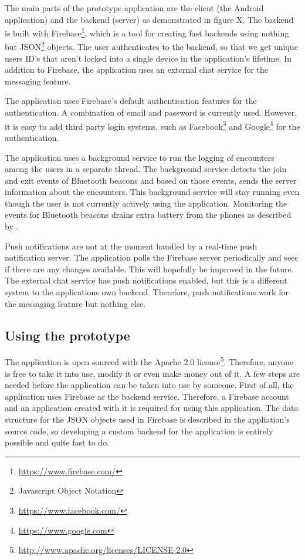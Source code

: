 The main parts of the prototype application are the client (the Android application) and the backend (server) as demonstrated in figure X. The backend is built with Firebase\footnote{\url{https://www.firebase.com/}}, which is a tool for creating fast backends using nothing but JSON\footnote{Javascript Object Notation} objects. The user authenticates to the backend, so that we get unique users ID's that aren't locked into a single device in the application's lifetime. In addition to Firebase, the application uses an external chat service for the messaging feature.

The application uses Firebase's default authentication features for the authentication. A combination of email and password is currently used. However, it is easy to add third party login systems, such as Facebook\footnote{\url{https://www.facebook.com/}} and Google\footnote{\url{https://www.google.com}} for the authentication.

The application uses a background service to run the logging of encounters among the users in a separate thread. The background service detects the join and exit events of Bluetooth beacons and based on those events, sends the server information about the encounters. This background service will stay running even though the user is not currently actively using the application. Monitoring the events for Bluetooth beacons drains extra battery from the phones as described by \citep{bluetoothOverview}.

Push notifications are not at the moment handled by a real-time push notification server. The application polls the Firebase server periodically and sees if there are any changes available. This will hopefully be improved in the future. The external chat service has push notifications enabled, but this is a different system to the applications own backend. Therefore, push notifications work for the messaging feature but nothing else.

\subsection{Using the prototype}

The application is open sourced with the Apache 2.0 license\footnote{\url{http://www.apache.org/licenses/LICENSE-2.0}}. Therefore, anyone is free to take it into use, modify it or even make money out of it. A few steps are needed before the application can be taken into use by someone. First of all, the application uses Firebase as the backend service. Therefore, a Firebase account and an application created with it is required for using this application. The data structure for the JSON objects used in Firebase is described in the appliation's source code, so developing a custom backend for the application is entirely possible and quite fast to do.

